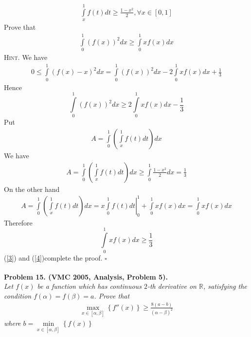 \documentclass{article}
\numberwithin{equation}{section}
\begin{document}
\begin{align}
\int\limits_x^1 {f\left( t \right)} dt \ge \frac{{1 - {x^2}}}{2},\forall x \in \left[ {0,1} \right]
\end{align}
Prove that
\begin{align}
\int\limits_0^1 {{{\left( {f\left( x \right)} \right)}^2}} dx \ge \int\limits_0^1 {xf\left( x \right)} dx
\end{align}
\textsc{Hint.} We have
\begin{align}
0 \le \int\limits_0^1 {{{\left( {f\left( x \right) - x} \right)}^2}} dx = \int\limits_0^1 {{{\left( {f\left( x \right)} \right)}^2}} dx - 2\int\limits_0^1 {xf\left( x \right)} dx + \frac{1}{3}
\end{align}
Hence
\begin{equation}
\label{3}
\int\limits_0^1 {{{\left( {f\left( x \right)} \right)}^2}} dx \ge 2\int\limits_0^1 {xf\left( x \right)} dx - \frac{1}{3}
\end{equation}
Put 
\begin{align}
A = \int\limits_0^1 {\left( {\int\limits_x^1 {f\left( t \right)} dt} \right)dx} 
\end{align}
We have
\begin{align}
A = \int\limits_0^1 {\left( {\int\limits_x^1 {f\left( t \right)} dt} \right)dx}  \ge \int\limits_0^1 {\frac{{1 - {x^2}}}{2}} dx = \frac{1}{3}
\end{align}
On the other hand
\begin{align}
A = \int\limits_0^1 {\left( {\int\limits_x^1 {f\left( t \right)} dt} \right)dx}  = \left. {x\int\limits_0^1 {f\left( t \right)} dt} \right|_0^1 + \int\limits_0^1 {xf\left( x \right)} dx = \int\limits_0^1 {xf\left( x \right)} dx
\end{align}
Therefore
\begin{equation}
\label{4}
\int\limits_0^1 {xf\left( x \right)} dx \ge \frac{1}{3}
\end{equation}
(\ref{3}) and (\ref{4})complete the proof. \hfill $\square$\\
\\
\textbf{Problem 15. (VMC 2005, Analysis, Problem 5).}\\
\textit{Let $f(x)$ be a function which has continuous $2$-th derivative on $\mathbb{R}$, satisfying the condition $f\left( \alpha  \right) = f\left( \beta  \right) = a$. Prove that
\begin{align}
\mathop {\max }\limits_{x \in \left[ {\alpha ,\beta } \right]} \left\{ {f''\left( x \right)} \right\} \ge \frac{{8\left( {a - b} \right)}}{{{{\left( {\alpha  - \beta } \right)}^2}}}
\end{align}
where $b = \mathop {\min }\limits_{x \in \left[ {\alpha ,\beta } \right]} \left\{ {f\left( x \right)} \right\}$}\\
\end{document}
